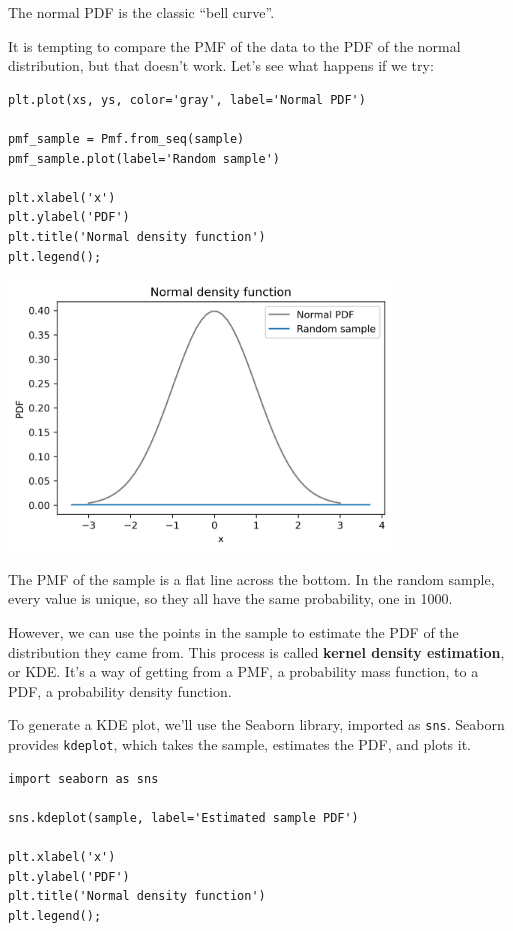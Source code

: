The normal PDF is the classic ``bell curve''.

It is tempting to compare the PMF of the data to the PDF of the normal
distribution, but that doesn't work. Let's see what happens if we try:

\begin{lstlisting}[]
plt.plot(xs, ys, color='gray', label='Normal PDF')

pmf_sample = Pmf.from_seq(sample)
pmf_sample.plot(label='Random sample')

plt.xlabel('x')
plt.ylabel('PDF')
plt.title('Normal density function')
plt.legend();
\end{lstlisting}

\begin{center}
\includegraphics[width=4in]{chapters/08_distributions_files/08_distributions_120_0.png}
\end{center}

The PMF of the sample is a flat line across the bottom. In the random
sample, every value is unique, so they all have the same probability,
one in 1000.

However, we can use the points in the sample to estimate the PDF of the
distribution they came from. This process is called \textbf{kernel
density estimation}, or KDE. It's a way of getting from a PMF, a
probability mass function, to a PDF, a probability density function.

To generate a KDE plot, we'll use the Seaborn library, imported as
\passthrough{\lstinline!sns!}. Seaborn provides
\passthrough{\lstinline!kdeplot!}, which takes the sample, estimates the
PDF, and plots it.

\begin{lstlisting}[]
import seaborn as sns

sns.kdeplot(sample, label='Estimated sample PDF')

plt.xlabel('x')
plt.ylabel('PDF')
plt.title('Normal density function')
plt.legend();
\end{lstlisting}

